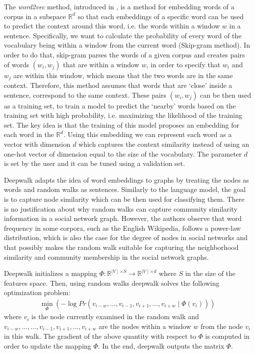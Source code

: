 The \emph{word2vec} method, introduced in \cite{mikolov2013efficient}, is a
method for embedding words of a corpus in a subspace $\mathbb{R}^d$ so that
each embeddings of a specific word can be used to predict the context around this
word, i.e. the words within a window $w$ in a sentence. Specifically, we
want to calculate the probability of every word of the vocabulary being
within a window from the current word (Skip-gram method).
In order to do that, skip-gram parses the words of a given corpus and creates
pairs of words $(w_i, w_j)$ that are within a window $w$, in order to specify
that $w_i$ and $w_j$ are within this window, which means that the two words
are in the same context. Therefore, this method assumes that words that are
`close' inside a sentence, correspond to the same context. These pairs
$(w_i, w_j)$ can be then used as a training set, to train a model to predict the
`nearby' words based on the training set with high probability, i.e. maximizing
the likelihood of the training set. The key idea is that the training of this
model proposes an embedding for each word in the $\mathbb{R}^d$.
Using this embedding we can represent each word as a vector with dimension $d$
which captures the context similarity instead of using an one-hot vector of
dimension equal to the size of the vocabulary. The parameter $d$ is set by the
user and it can be tuned using a validation set.

Deepwalk adapts the idea of word embeddings to graphs by treating the nodes as
words and random walks as sentences. Similarly to the language model, the goal
is to capture node similarity which can be then used for classifying them.
There is no justification about why random walks can capture community
similarity information in a social network graph. However, the authors
observe that word frequency in some corpora, such as the English Wikipedia,
follows a power-law distribution, which is also the case for the degree of nodes
in social networks and that
possibly makes the random walk suitable for capturing the neighborhood
similarity and community membership in the social network graphs.

Deepwalk initializes a mapping
$\Phi: \mathbb{R}^{\mid V \mid \times S} \to \mathbb{R}^{\mid V\mid \times d}$
where $S$ in the size of the features space. Then, using random walks deepwalk
solves the following optimization problem:
\begin{align}
    \min_{\Phi}
        \left (-\log{Pr({v_{i-w},
                \ldots, v_{i-1}, v_{i+1},
                \ldots , v_{i+w}} \mid \Phi(v_i))}
        \right )
\end{align}
where $v_i$ is the node currently examined in the random walk and
$v_{i-w}, \ldots, \ldots, v_{i-1}, v_{i+1},\ldots, v_{i+w}$ are the nodes
within a window $w$ from the node $v_i$ in this walk. The gradient of the above
quantity with respect to $\Phi$ is
computed in order to update the mapping $\Phi$. In the end, deepwalk outputs
the matrix $\Phi$.


